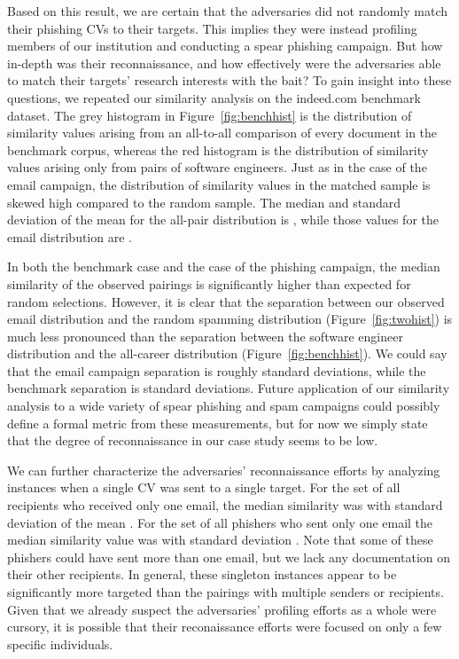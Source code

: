 \documentclass[conference]{IEEEtran}
\begin{document}
Based on this result, we are certain that the adversaries did not randomly match their phishing CVs to their targets.  This implies they were instead 
profiling members of our institution and conducting a spear phishing campaign.  But how in-depth was their reconnaissance, and how effectively 
were the adversaries able to match their targets' research interests with the bait?  To gain insight into these questions, we repeated our similarity 
analysis on the indeed.com benchmark dataset.  The grey histogram in Figure~\ref{fig:benchhist} is the distribution of similarity
values arising from an all-to-all comparison of every document in the benchmark corpus, whereas the red histogram is the distribution of similarity values arising only from pairs of 
software engineers.  Just as in the case of 
the email campaign, the distribution of similarity values in the matched sample is skewed high compared to the random sample.  The median and standard deviation of the mean for the all-pair distribution is 
, while those values for the email distribution are . 

In both the benchmark case and the case of the phishing campaign, the median similarity of the observed pairings is significantly higher than expected for random selections.  However, it is clear that the separation between our observed email distribution and the random spamming distribution 
(Figure~\ref{fig:twohist}) is much less pronounced than the separation between the software engineer distribution and the all-career distribution 
(Figure~\ref{fig:benchhist}).  We could say that the email campaign separation is roughly  standard deviations, while the 
benchmark separation is  standard deviations.  Future application of our similarity analysis to a wide variety of 
spear phishing and spam campaigns could possibly define a formal metric from these measurements, but for now we simply state that the degree 
of reconnaissance in our case study seems to be low.


We can further characterize the adversaries' reconnaissance efforts by analyzing instances when a single CV was sent to a single target.  
For the set of all recipients who received only one email, the median similarity was  with standard deviation of the mean .  For the set 
of all phishers who sent only one email the median similarity value was  with standard deviation .  Note that some of these phishers could have sent more than 
one email, but we lack any documentation on their other recipients.  In general, these singleton instances appear to be significantly more targeted than the pairings with multiple senders or recipients.  Given that we already suspect the adversaries' profiling efforts as a whole were cursory, it is possible that their 
reconaissance efforts were focused on only a few specific individuals.
\end{document}
